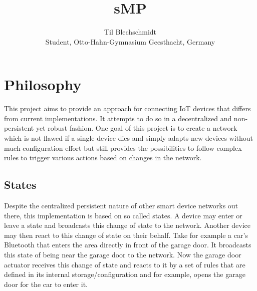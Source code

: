 \documentclass[a4paper]{article}
\title{}
\author{}
\title{sMP}
\author{Til Blechschmidt\\ Student, Otto-Hahn-Gymnasium Geesthacht, Germany}
\begin{document}
	\maketitle
	\newpage
	
	\tableofcontents
	\listoffigures
	\listoftables
	\newpage
	
	

    \section{Philosophy}
        This project aims to provide an approach for connecting IoT devices that differs from current implementations.
        It attempts to do so in a decentralized and non-persistent yet robust fashion. One goal of this project is to
        create a network which is not flawed if a single device dies and simply adapts new devices without much
        configuration effort but still provides the possibilities to follow complex rules to trigger various actions
        based on changes in the network.
        \subsection{States}
	        Despite the centralized persistent nature of other smart device networks out there, this
	        implementation is based on so called states. A device may enter or leave a state and broadcasts this change
	        of state to the network. Another device may then react to this change of state on their behalf. Take for example a car's Bluetooth that enters the area
	        directly in front of the garage door. It broadcasts this state of being near the garage door to the
	        network. Now the garage door actuator receives this change of state and reacts to it by a set of rules that
	        are defined in its internal storage/configuration and for example, opens the garage door for the car
	        to enter it.\\
\end{document}
